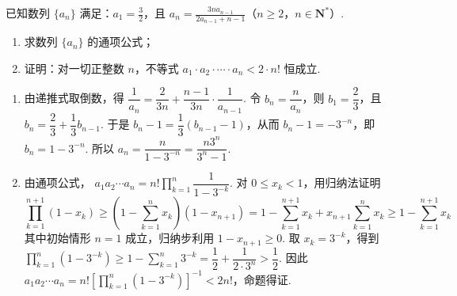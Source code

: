 \begin{problem}
已知数列 \(\{a_{n}\}\) 满足：\(a_{1} = \frac{3}{2}\)，且 \(a_{n} = \frac{3na_{n-1}}{2a_{n-1} + n - 1}\)（\(n \geqslant 2\)，\(n \in \mathbf{N}^{*}\)）.

\begin{enumerate}
\item 求数列 \(\{a_{n}\}\) 的通项公式；
\item 证明：对一切正整数 \(n\)，不等式 \(a_1 \cdot a_2 \cdot \cdots \cdot a_n < 2 \cdot n!\) 恒成立.
\end{enumerate}
\end{problem}

\begin{solution}
\begin{enumerate}
\item 由递推式取倒数，得
\(\dfrac1{a_n}=\dfrac2{3n}+\dfrac{n-1}{3n}\cdot\dfrac1{a_{n-1}}\). 令 \(b_n=\dfrac n{a_n}\)，则 \(b_1=\dfrac23\)，且
\(b_n=\dfrac23+\dfrac13b_{n-1}\). 于是 \(b_n-1=\dfrac13(b_{n-1}-1)\)，从而 \(b_n-1=-3^{-n}\)，即 \(b_n=1-3^{-n}\). 所以
\(a_n=\dfrac{n}{1-3^{-n}}=\dfrac{n3^n}{3^n-1}\).
\item 由通项公式，
\(a_1a_2\cdots a_n=n!\prod_{k=1}^n\dfrac1{1-3^{-k}}\). 对 \(0\leqslant x_k<1\)，用归纳法证明
\[
\prod_{k=1}^{n+1}(1-x_k)
\geqslant\left(1-\sum_{k=1}^{n}x_k\right)(1-x_{n+1})
=1-\sum_{k=1}^{n+1}x_k+x_{n+1}\sum_{k=1}^{n}x_k
\geqslant1-\sum_{k=1}^{n+1}x_k
\]
其中初始情形 \(n=1\) 成立，归纳步利用 \(1-x_{n+1}\geqslant0\). 取 \(x_k=3^{-k}\)，得到
\(\prod_{k=1}^n(1-3^{-k})\geqslant1-\sum_{k=1}^n3^{-k}=\dfrac12+\dfrac1{2\cdot3^n}>\dfrac12\). 因此
\(a_1a_2\cdots a_n=n!\left[\prod_{k=1}^n(1-3^{-k})\right]^{-1}<2n!\)，命题得证.
\end{enumerate}
\end{solution}
